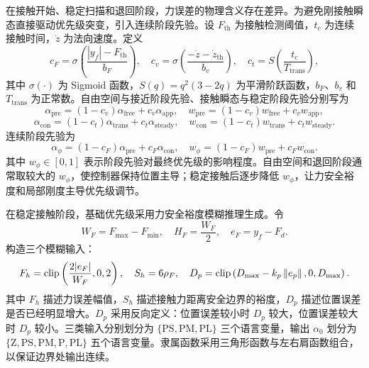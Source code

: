 在接触开始、稳定扫描和退回阶段，力误差的物理含义存在差异。为避免刚接触瞬态直接驱动优先级突变，引入连续阶段先验。设 $F_{\mathrm{th}}$ 为接触检测阈值，$t_c$ 为连续接触时间，$\dot z$ 为法向速度。定义
\begin{equation}
  c_F=\sigma\left(\frac{|y_f|-F_{\mathrm{th}}}{b_F}\right),
  \quad
  c_v=\sigma\left(\frac{-\dot z-\dot z_{\mathrm{th}}}{b_v}\right),
  \quad
  c_t=S\left(\frac{t_c}{T_{\mathrm{trans}}}\right),
  \label{eq:ch3_phase_gates}
\end{equation}
其中 $\sigma(\cdot)$ 为 Sigmoid 函数，$S(q)=q^2(3-2q)$ 为平滑阶跃函数，$b_F$、$b_v$ 和 $T_{\mathrm{trans}}$ 为正常数。自由空间与接近阶段先验、接触瞬态与稳定阶段先验分别写为
\begin{equation}
  \alpha_{\mathrm{pre}}=(1-c_v)\alpha_{\mathrm{free}}+c_v\alpha_{\mathrm{app}},
  \quad
  w_{\mathrm{pre}}=(1-c_v)w_{\mathrm{free}}+c_vw_{\mathrm{app}},
  \label{eq:ch3_phase_pre}
\end{equation}
\begin{equation}
  \alpha_{\mathrm{con}}=(1-c_t)\alpha_{\mathrm{trans}}+c_t\alpha_{\mathrm{steady}},
  \quad
  w_{\mathrm{con}}=(1-c_t)w_{\mathrm{trans}}+c_tw_{\mathrm{steady}} .
  \label{eq:ch3_phase_contact}
\end{equation}
连续阶段先验为
\begin{equation}
  \alpha_\phi=(1-c_F)\alpha_{\mathrm{pre}}+c_F\alpha_{\mathrm{con}},
  \quad
  w_\phi=(1-c_F)w_{\mathrm{pre}}+c_Fw_{\mathrm{con}} .
  \label{eq:ch3_phase_prior}
\end{equation}
其中 $w_\phi\in[0,1]$ 表示阶段先验对最终优先级的影响程度。自由空间和退回阶段通常取较大的 $w_\phi$，使控制器保持位置主导；稳定接触后逐步降低 $w_\phi$，让力安全裕度和局部刚度主导优先级调节。

在稳定接触阶段，基础优先级采用力安全裕度模糊推理生成。令
\begin{equation}
  W_F=F_{\max}-F_{\min},
  \quad H_F=\frac{W_F}{2},
  \quad e_F=y_f-F_d .
  \label{eq:ch3_force_width}
\end{equation}
构造三个模糊输入：
\begin{equation}
  F_h=\operatorname{clip}\left(\frac{2|e_F|}{W_F},0,2\right),
  \quad
  S_h=6\rho_F,
  \quad
  D_p=\operatorname{clip}\left(D_{\max}-k_p\left\lVert e_p\right\rVert,0,D_{\max}\right).
  \label{eq:ch3_fuzzy_inputs}
\end{equation}
其中 $F_h$ 描述力误差幅值，$S_h$ 描述接触力距离安全边界的裕度，$D_p$ 描述位置误差是否已经明显增大。$D_p$ 采用反向定义：位置误差较小时 $D_p$ 较大，位置误差较大时 $D_p$ 较小。三类输入分别划分为 $\{\mathrm{PS},\mathrm{PM},\mathrm{PL}\}$ 三个语言变量，输出 $\alpha_0$ 划分为 $\{\mathrm{Z},\mathrm{PS},\mathrm{PM},\mathrm{P},\mathrm{PL}\}$ 五个语言变量。隶属函数采用三角形函数与左右肩函数组合，以保证边界处输出连续。

